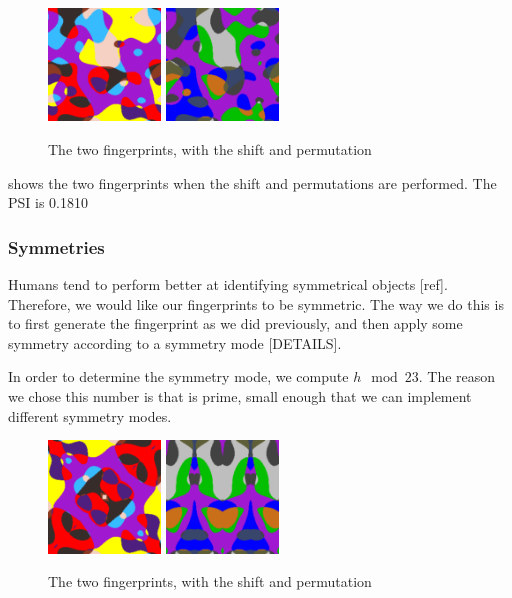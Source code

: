 \documentclass{article}
\begin{document}
\begin{center}
\begin{figure}
    \centering
    \includegraphics[width=3cm]{figures/Shift.png}
    \hspace{3pt}
    \includegraphics[width=3cm]{figures/ShiftP67.png}
    \caption{The two fingerprints, with the shift and permutation}
    \label{fig:shifted}
\end{figure}
\end{center}

 shows the two fingerprints when the shift and permutations are performed. The PSI is 0.1810


\subsubsection{Symmetries}
Humans tend to perform better at identifying symmetrical objects [ref]. Therefore, we would like our fingerprints to be symmetric. The way we do this is to first generate the fingerprint as we did previously, and then apply some symmetry according to a symmetry mode [DETAILS].

In order to determine the symmetry mode, we compute $h \mod 23$. The reason we chose this number is that is prime, small enough that we can implement different symmetry modes.

\begin{center}
\begin{figure}
    \centering
    \includegraphics[width=3cm]{figures/Symmetry.png}
    \hspace{3pt}
    \includegraphics[width=3cm]{figures/SymmetryP67.png}
    \caption{The two fingerprints, with the shift and permutation}
    \label{fig:shifted}
\end{figure}
\end{center}
\end{document}
